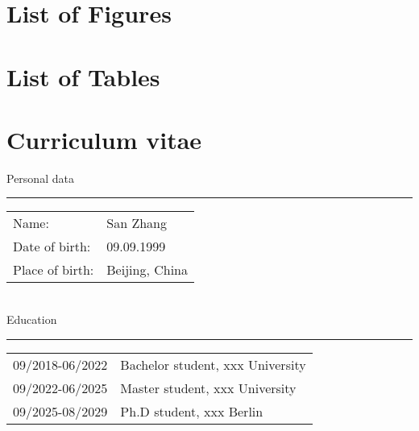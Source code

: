 \documentclass[a4paper,12pt,UTF8,openright]{book}
\begin{document}
{}


\chapter*{List of Figures}

\chapter*{List of Tables}

\chapter*{Curriculum vitae}

\noindent Personal data

\noindent\rule{\textwidth}{0.4pt}

\vskip 0.1in

\begin{tabular}{p{}p{}}
	Name: & San Zhang \\
	Date of birth: & 09.09.1999 \\
	Place of birth: & Beijing, China \\
\end{tabular} \\

\noindent Education

\noindent\rule{\textwidth}{0.4pt}

\vskip 0.1in

\begin{tabular}{p{}p{}}
	09/2018-06/2022 & Bachelor student, xxx University \\
	09/2022-06/2025 & Master student, xxx University \\
	09/2025-08/2029 & Ph.D student, xxx Berlin \\
\end{tabular} \\
\end{document}
